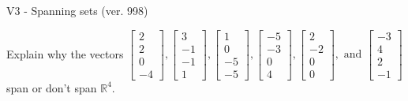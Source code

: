 \begin{exercise}
  \begin{exerciseTitle}V3 - Spanning sets (ver. 998)\end{exerciseTitle}
  \begin{exerciseStatement}
    Explain why the vectors \(\left[\begin{array}{r}
2 \\
2 \\
0 \\
-4
\end{array}\right] , \left[\begin{array}{r}
3 \\
-1 \\
-1 \\
1
\end{array}\right] , \left[\begin{array}{r}
1 \\
0 \\
-5 \\
-5
\end{array}\right] , \left[\begin{array}{r}
-5 \\
-3 \\
0 \\
4
\end{array}\right] , \left[\begin{array}{r}
2 \\
-2 \\
0 \\
0
\end{array}\right] , \text{ and } \left[\begin{array}{r}
-3 \\
4 \\
2 \\
-1
\end{array}\right]\) span or don't span \(\mathbb{R}^4\). 
	



\end{exerciseStatement}
\end{exercise}
